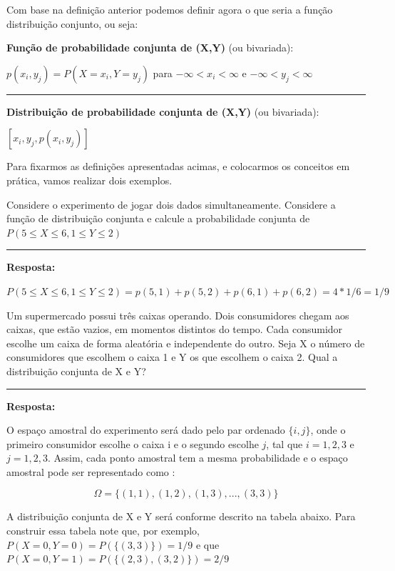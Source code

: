 \documentclass[
  letterpaper,
  DIV=11,
  numbers=noendperiod]{scrartcl}
\begin{document}
Com base na definição anterior podemos definir agora o que seria a
função distribuição conjunto, ou seja:

\begin{definicao}

\textbf{Função de probabilidade conjunta de (X,Y)} (ou bivariada):

\(p(x_{i},y_{j})= P(X=x_{i},Y=y_{j})\) para \(-\infty < x_{i}< \infty\)
e \(-\infty < y_{j}< \infty\)

\begin{center}\rule{0.5\linewidth}{0.5pt}\end{center}

\textbf{Distribuição de probabilidade conjunta de (X,Y)} (ou bivariada):

\([x_{i},y_{j},p(x_{i},y_{j})]\)

\end{definicao}

Para fixarmos as definições apresentadas acimas, e colocarmos os
conceitos em prática, vamos realizar dois exemplos.

\begin{exemplo}

Considere o experimento de jogar dois dados simultaneamente. Considere a
função de distribuição conjunta e calcule a probabilidade conjunta de
\(P(5\leq X \leq 6, 1 \leq Y \leq 2)\)

\begin{center}\rule{0.5\linewidth}{0.5pt}\end{center}

\textbf{Resposta:}

\(P(5\leq X \leq 6, 1 \leq Y \leq 2)= p(5,1)+p(5,2) + p(6,1)+p(6,2) = 4 * 1/6= 1/9\)

\end{exemplo}

\begin{exemplo}

Um supermercado possui três caixas operando. Dois consumidores chegam
aos caixas, que estão vazios, em momentos distintos do tempo. Cada
consumidor escolhe um caixa de forma aleatória e independente do outro.
Seja X o número de consumidores que escolhem o caixa 1 e Y os que
escolhem o caixa 2. Qual a distribuição conjunta de X e Y?

\begin{center}\rule{0.5\linewidth}{0.5pt}\end{center}

\textbf{Resposta:}

O espaço amostral do experimento será dado pelo par ordenado
\(\{ i,j \}\), onde o primeiro consumidor escolhe o caixa i e o segundo
escolhe \(j\), tal que \(i=1,2,3\) e \(j=1,2,3\). Assim, cada ponto
amostral tem a mesma probabilidade e o espaço amostral pode ser
representado como :

\[\Omega = { \{(1,1),(1,2),(1,3),...,(3,3)\} } \]

A distribuição conjunta de X e Y será conforme descrito na tabela
abaixo. Para construir essa tabela note que, por exemplo,
\(P(X=0,Y=0)=P(\{(3,3)\})=1/9\) e que
\(P(X=0,Y=1)=P(\{(2,3),(3,2)\})=2/9\)

\end{exemplo}
\end{document}
